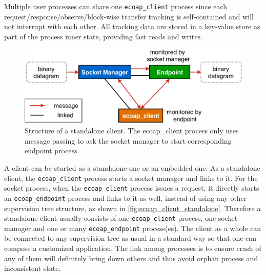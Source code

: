 Multiple user processes can share one \verb|ecoap_client| process since each request/response/observe/block-wise transfer tracking is self-contained and will not interrupt with each other. All tracking data are stored in a key-value store as part of the process inner state, providing fast reads and writes. 

\begin{figure}[!htbp]
\centering
\includegraphics[scale = 0.7]{ecoap_client_standalone}
\caption[Structure of a standalone client]{Structure of a standalone client. The ecoap\_client process only uses message passing to ask the socket manager to start corresponding endpoint process.}
\label{fig:ecoap_client_standalone}
\end{figure}

A client can be started as a standalone one or an embedded one. As a standalone client, the \verb|ecoap_client| process starts a socket manager and links to it. For the socket process, when the \verb|ecoap_client| process issues a request, it directly starts an \verb|ecoap_endpoint| process and links to it as well, instead of using any other supervision tree structure, as shown in \autoref{fig:ecoap_client_standalone}. Therefore a standalone client usually consists of one \verb|ecoap_client| process, one socket manager and one or many \verb|ecoap_endpoint| process(es). The client as a whole can be connected to any supervision tree as usual in a standard way so that one can compose a customized application. The link among processes is to ensure crash of any of them will definitely bring down others and thus avoid orphan process and inconsistent state. 

